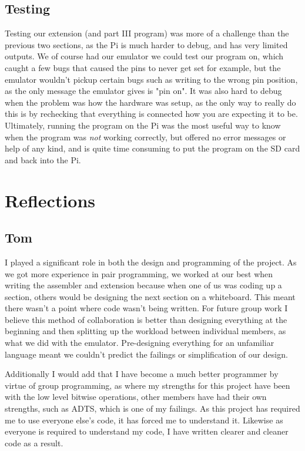 \documentclass[a4paper]{article}
\begin{document}
\subsection{Testing}

Testing our extension (and part III program) was more of a challenge than the previous two sections, as the Pi is much harder to debug, and has very limited outputs.
We of course had our emulator we could test our program on, which caught a few bugs that caused the pins to never get set for example, but the emulator wouldn't pickup certain bugs such as writing to the wrong pin position, as the only message the emulator gives is "pin on".
It was also hard to debug when the problem was how the hardware was setup, as the only way to really do this is by rechecking that everything is connected how you are expecting it to be.
Ultimately, running the program on the Pi was the most useful way to know when the program was \textit{not} working correctly, but offered no error messages or help of any kind, and is quite time consuming to put the program on the SD card and back into the Pi.

\section{Reflections}

\subsection{Tom}

I played a significant role in both the design and programming of the project. As we got more experience in pair programming, we worked at our best when writing the assembler and extension because when one of us was coding up a section, others would be designing the next section on a whiteboard. This meant there wasn't a point where code wasn't being written. For future group work I believe this method of collaboration is better than designing everything at the beginning and then splitting up the workload between individual members, as what we did with the emulator. Pre-designing everything for an unfamiliar language meant we couldn't predict the failings or simplification of our design.

Additionally I would add that I have become a much better programmer by virtue of group programming, as where my strengths for this project have been with the low level bitwise operations, other members have had their own strengths, such as ADTS, which is one of my failings. As this project has required me to use everyone else's code, it has forced me to understand it. Likewise as everyone is required to understand my code, I have written clearer and cleaner code as a result.
\end{document}
